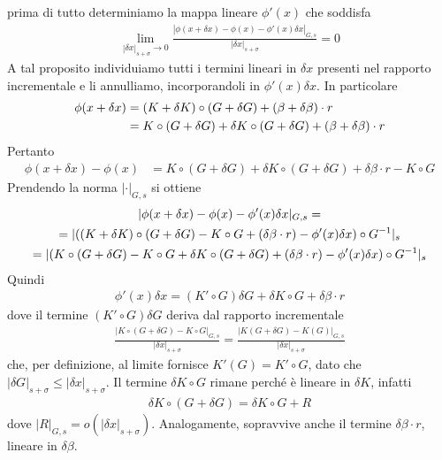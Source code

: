 \documentclass[twoside, 11pt]{amsbook}
\makeatletter
\newcommand{\0}{{(0)}}
\newcommand{\3}{{(3)}}
\theoremstyle{colonplain}
\theoremstyle{colondefinition}
\theoremstyle{colonremark}
\numberwithin{equation}{chapter}
\renewcommand{\proofname}{Dimostrazione}
\renewenvironment{proof}[1][\proofname]{\par
  \pushQED{\qed}%
  \normalfont \topsep6\p@\@plus6\p@\relax
  \trivlist
  \item[\hskip\labelsep\bfseries #1:]\ignorespaces
}{%
  \popQED\endtrivlist\@endpefalse
}
\makeatother
\begin{document}
\begin{proof} prima di tutto determiniamo la mappa lineare $\phi'(x)$ che soddisfa
\begin{align}
    \lim_{|\delta x|_{s + \sigma} \rightarrow 0} \frac{|\phi(x + \delta x) - \phi(x) - \phi'(x)\delta x|_{G, s}}{|\delta x|_{s + \sigma}} = 0
\end{align}
A tal proposito individuiamo tutti i termini lineari in $\delta x$ presenti nel rapporto incrementale e li annulliamo, incorporandoli in $\phi'(x)\delta x$. In particolare
\begin{align}
    \phi(x + \delta x) &= (K + \delta K) \circ (G + \delta G) + (\beta + \delta \beta) \cdot r \notag \\
    &= K \circ (G + \delta G) + \delta K \circ (G + \delta G) + (\beta + \delta \beta) \cdot r
\end{align}
Pertanto
\begin{align}
    \phi(x + \delta x) - \phi(x) &= K \circ (G + \delta G) + \delta K \circ (G + \delta G) + \delta\beta \cdot r - K \circ G
\end{align}
Prendendo la norma $|\cdot|_{G, s}$ si ottiene
\begin{gather}
    |\phi(x + \delta x) - \phi(x) - \phi'(x)\delta x|_{G, s} = \notag \\
    = |((K + \delta K )\circ (G + \delta G) - K \circ G + (\delta\beta \cdot r) - \phi'(x)\delta x) \circ G^{-1}|_{s} \notag \\
    = |(K \circ (G + \delta G) - K \circ G + \delta K \circ (G + \delta G) + (\delta\beta \cdot r) - \phi'(x)\delta x)\circ G^{-1}|_s
\end{gather}
Quindi
\begin{align}
    \phi'(x)\delta x = (K' \circ G)\delta G + \delta K \circ G + \delta\beta \cdot r 
\end{align}
dove il termine $(K' \circ G)\delta G$ deriva dal rapporto incrementale
\begin{align}
    \frac{|K \circ (G + \delta G) - K \circ G|_{G, s}}{|\delta x|_{s + \sigma}} = \frac{|K(G + \delta G) - K(G)|_{G, s}}{|\delta x|_{s + \sigma}}
\end{align}
che, per definizione, al limite fornisce $K'(G) = K' \circ G$, dato che $|\delta G|_{s + \sigma} \leq |\delta x|_{s + \sigma}$. Il termine $\delta K \circ G$ rimane perché è lineare in $\delta K$, infatti
\begin{align}
    \delta K \circ (G + \delta G) = \delta K \circ G + R
\end{align}
dove $|R|_{G, s} = o(|\delta x|_{s + \sigma})$. Analogamente, sopravvive anche il termine $\delta\beta \cdot r$, lineare in $\delta\beta$. \\

\end{proof}
\end{document}
